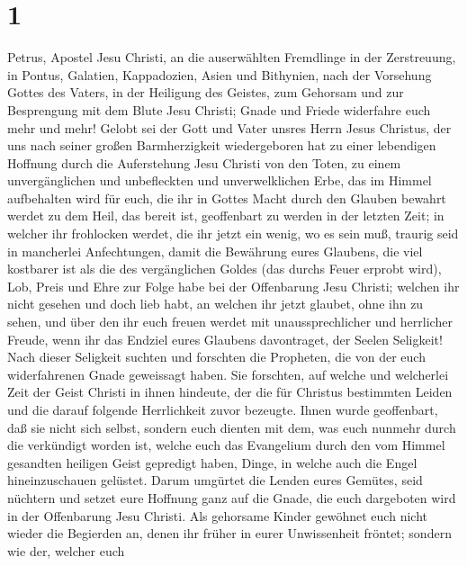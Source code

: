 \hypertarget{section}{%
\section{1}\label{section}}

 Petrus, Apostel Jesu Christi, an die auserwählten
Fremdlinge in der Zerstreuung, in Pontus, Galatien, Kappadozien, Asien
und Bithynien,  nach der Vorsehung Gottes des Vaters, in
der Heiligung des Geistes, zum Gehorsam und zur Besprengung mit dem
Blute Jesu Christi; Gnade und Friede widerfahre euch mehr und mehr!
 Gelobt sei der Gott und Vater unsres Herrn Jesus
Christus, der uns nach seiner großen Barmherzigkeit wiedergeboren hat zu
einer lebendigen Hoffnung durch die Auferstehung Jesu Christi von den
Toten,  zu einem unvergänglichen und unbefleckten und
unverwelklichen Erbe, das im Himmel aufbehalten wird für euch,
 die ihr in Gottes Macht durch den Glauben bewahrt werdet
zu dem Heil, das bereit ist, geoffenbart zu werden in der letzten Zeit;
 in welcher ihr frohlocken werdet, die ihr jetzt ein
wenig, wo es sein muß, traurig seid in mancherlei Anfechtungen,
 damit die Bewährung eures Glaubens, die viel kostbarer
ist als die des vergänglichen Goldes (das durchs Feuer erprobt wird),
Lob, Preis und Ehre zur Folge habe bei der Offenbarung Jesu Christi;
 welchen ihr nicht gesehen und doch lieb habt, an welchen
ihr jetzt glaubet, ohne ihn zu sehen, und über den ihr euch freuen
werdet mit unaussprechlicher und herrlicher Freude,  wenn
ihr das Endziel eures Glaubens davontraget, der Seelen Seligkeit!
 Nach dieser Seligkeit suchten und forschten die
Propheten, die von der euch widerfahrenen Gnade geweissagt haben.
 Sie forschten, auf welche und welcherlei Zeit der Geist
Christi in ihnen hindeute, der die für Christus bestimmten Leiden und
die darauf folgende Herrlichkeit zuvor bezeugte.  Ihnen
wurde geoffenbart, daß sie nicht sich selbst, sondern euch dienten mit
dem, was euch nunmehr durch die verkündigt worden ist, welche euch das
Evangelium durch den vom Himmel gesandten heiligen Geist gepredigt
haben, Dinge, in welche auch die Engel hineinzuschauen gelüstet.
 Darum umgürtet die Lenden eures Gemütes, seid nüchtern
und setzet eure Hoffnung ganz auf die Gnade, die euch dargeboten wird in
der Offenbarung Jesu Christi.  Als gehorsame Kinder
gewöhnet euch nicht wieder die Begierden an, denen ihr früher in eurer
Unwissenheit fröntet;  sondern wie der, welcher euch
